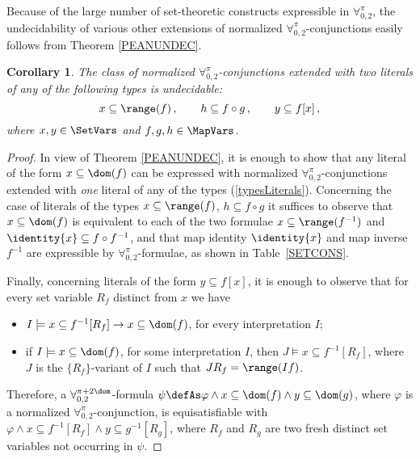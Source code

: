 \documentclass[submission,copyright,creativecommons]{eptcs}
\newtheorem{corollary}{Corollary}
\newcommand{\Lang}{\ensuremath{\mathbf{\forall}^{\pi}_{0,2}}\xspace}
\newcommand{\inter}{I}
\newcommand{\interp}{J}
\newcommand{\Langdom}{\ensuremath{\mathbf{\forall}^{\pi +2 \dom}_{0,2}}\xspace}
\newcommand{\svx}{x}
\newcommand{\svy}{y}
\newcommand{\mvx}{f}
\newcommand{\mvy}{g}
\newcommand{\mvz}{h}
\begin{document}
Because of the large number of set-theoretic constructs expressible in
\Lang, the undecidability of various other extensions of normalized
\Lang-conjunctions easily follows from Theorem \ref{PEANUNDEC}.

\begin{corollary}\label{OTHERUNDEC}
The class of normalized \Lang-conjunctions extended with two
literals of any of the following types is undecidable:
\begin{equation}
    \label{typesLiterals}
 \svx \subseteq \range(\mvx)\,, \qquad 
 \mvz \subseteq \mvx \circ \mvy\,, \qquad
\svy \subseteq \mvx[\svx]\,,
\end{equation}
where $\svx, \svy \in \SetVars$ and $\mvx, \mvy, \mvz \in \MapVars$.
\end{corollary}
\begin{proof}
In view of Theorem \ref{PEANUNDEC}, it is enough to show that any
literal of the form $\svx \subseteq \dom(\mvx)$ can be expressed with
normalized \Lang-conjunctions extended with \emph{one} literal of any
of the types (\ref{typesLiterals}).  Concerning the case of literals
of the types
$\svx \subseteq \range(\mvx)$, $\mvz \subseteq \mvx \circ \mvy$
it suffices to observe that $\svx \subseteq \dom(\mvx)$ is equivalent
to each of the two formulae
$\svx \subseteq \range (\mvx^{-1})$ and 
$\identity{\svx} \subseteq \mvx \circ \mvx^{-1}$,
and that map identity $\identity{\svx}$ and map inverse $\mvx^{-1}$ 
are expressible by \Lang-formulae, as shown in Table~\ref{SETCONS}.

Finally, concerning literals of the form $\svy \subseteq \mvx[\svx]$,
it is enough to observe that for every set variable $R_{\mvx}$
distinct from $\svx$ we have
\begin{itemize}
    \item $\inter \models \svx \subseteq \mvx^{-1}[R_{\mvx}] \rightarrow 
    x \subseteq \dom(\mvx)$, for every interpretation $\inter$;
    
    \item if $\inter \models x \subseteq \dom(\mvx)$, for some
    interpretation $\inter$, then $\interp \models \svx \subseteq
    \mvx^{-1}[R_{\mvx}]$, where $\interp$ is the
    $\{R_{\mvx}\}$-variant of $\inter$ such that $\interp R_{\mvx} =
    \range(\inter \mvx)$.
\end{itemize}
Therefore, a $\Langdom$-formula $\psi \defAs \varphi \wedge \svx
\subseteq \dom(\mvx) \wedge \svy \subseteq \dom(\mvy)$, where $\varphi$
is a normalized \Lang-conjunction, is equisatisfiable with $\varphi
\wedge \svx \subseteq \mvx^{-1}[R_{\mvx}] \wedge \svy \subseteq 
\mvy^{-1}[R_{\mvy}]$, where $R_{\mvx}$ and $R_{\mvy}$ are two fresh 
distinct set variables not occurring in $\psi$.
\end{proof}
\end{document}

